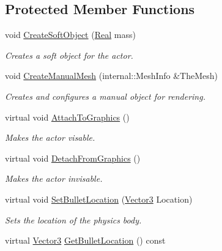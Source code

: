 \subsection*{Protected Member Functions}
\begin{DoxyCompactItemize}
\item 
void \hyperlink{classphys_1_1ActorSoft_acc0ff92e2dcc0e5d99ca62f07bc9174d}{CreateSoftObject} (\hyperlink{namespacephys_af7eb897198d265b8e868f45240230d5f}{Real} mass)
\begin{DoxyCompactList}\small\item\em Creates a soft object for the actor. \item\end{DoxyCompactList}\item 
void \hyperlink{classphys_1_1ActorSoft_a341d9124acd59a4597745c3eff06dfc8}{CreateManualMesh} (internal::MeshInfo \&TheMesh)
\begin{DoxyCompactList}\small\item\em Creates and configures a manual object for rendering. \item\end{DoxyCompactList}\item 
virtual void \hyperlink{classphys_1_1ActorSoft_a37b3bf631e8f73b3f19c3bb043d011c3}{AttachToGraphics} ()
\begin{DoxyCompactList}\small\item\em Makes the actor visable. \item\end{DoxyCompactList}\item 
virtual void \hyperlink{classphys_1_1ActorSoft_a568b070c746775b73a3aa8ab33d6cc58}{DetachFromGraphics} ()
\begin{DoxyCompactList}\small\item\em Makes the actor invisable. \item\end{DoxyCompactList}\item 
virtual void \hyperlink{classphys_1_1ActorSoft_aef041f3eee69bb8eceef32fa0513e340}{SetBulletLocation} (\hyperlink{classphys_1_1Vector3}{Vector3} Location)
\begin{DoxyCompactList}\small\item\em Sets the location of the physics body. \item\end{DoxyCompactList}\item 
virtual \hyperlink{classphys_1_1Vector3}{Vector3} \hyperlink{classphys_1_1ActorSoft_a2b30f96cb01df382a774dfae5200fed0}{GetBulletLocation} () const 

\end{DoxyCompactItemize}
